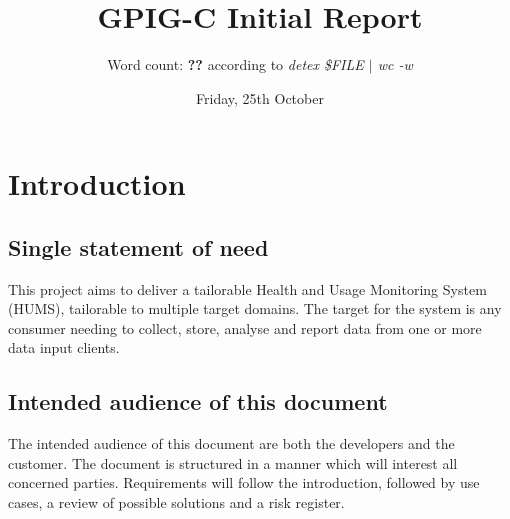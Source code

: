 \documentclass[10pt,a4paper]{article}
\begin{document}
\title{\vspace{-1cm}GPIG-C Initial Report}
\author{Word count: \textbf{??} according to \textsl{detex \$FILE $\vert$ wc -w}}
\date{Friday, 25th October}
\maketitle
\thispagestyle{fancy} %

\section{Introduction}
\subsection{Single statement of need}
This project aims to deliver a tailorable Health and Usage Monitoring System (HUMS), tailorable to multiple target domains. The target for the system is any consumer needing to collect, store, analyse and report data from one or more data input clients.
\subsection{Intended audience of this document}
The intended audience of this document are both the developers and the customer. The document is structured in a manner which will interest all concerned parties. Requirements will follow the introduction, followed by use cases, a review of possible solutions and a risk register.
\end{document}
